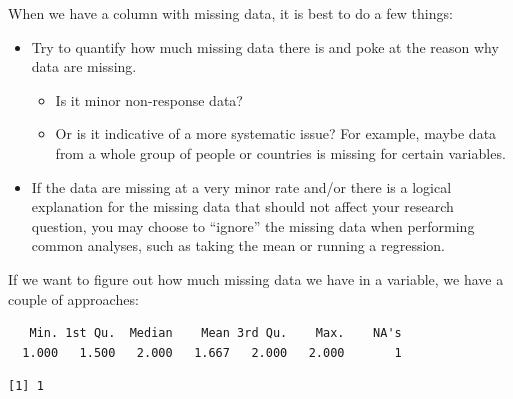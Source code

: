 \documentclass[
  letterpaper,
  DIV=11,
  numbers=noendperiod]{scrreprt}
\newenvironment{Shaded}{\begin{snugshade}}{\end{snugshade}}
\newcommand{\DocumentationTok}[1]{\textcolor[rgb]{0.37,0.37,0.37}{\textit{#1}}}
\newcommand{\FunctionTok}[1]{\textcolor[rgb]{0.28,0.35,0.67}{#1}}
\newcommand{\NormalTok}[1]{\textcolor[rgb]{0.00,0.23,0.31}{#1}}
\newcommand{\SpecialCharTok}[1]{\textcolor[rgb]{0.37,0.37,0.37}{#1}}
\providecommand{\tightlist}{%
  \setlength{\itemsep}{0pt}\setlength{\parskip}{0pt}}\usepackage{longtable,booktabs,array}
\begin{document}
When we have a column with missing data, it is best to do a few things:

\begin{itemize}
\tightlist
\item
  Try to quantify how much missing data there is and poke at the reason
  why data are missing.

  \begin{itemize}
  \tightlist
  \item
    Is it minor non-response data?
  \item
    Or is it indicative of a more systematic issue? For example, maybe
    data from a whole group of people or countries is missing for
    certain variables.
  \end{itemize}
\item
  If the data are missing at a very minor rate and/or there is a logical
  explanation for the missing data that should not affect your research
  question, you may choose to ``ignore'' the missing data when
  performing common analyses, such as taking the mean or running a
  regression.
\end{itemize}

If we want to figure out how much missing data we have in a variable, we
have a couple of approaches:

\begin{Shaded}
\end{Shaded}

\begin{verbatim}
   Min. 1st Qu.  Median    Mean 3rd Qu.    Max.    NA's 
  1.000   1.500   2.000   1.667   2.000   2.000       1 
\end{verbatim}

\begin{Shaded}
\end{Shaded}

\begin{verbatim}
[1] 1
\end{verbatim}
\end{document}
